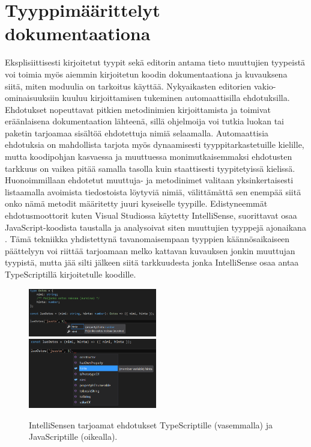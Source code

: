 \section{Tyyppimäärittelyt dokumentaationa}
Eksplisiittisesti kirjoitetut tyypit sekä editorin antama tieto muuttujien
tyypeistä voi toimia myös aiemmin kirjoitetun koodin dokumentaationa ja
kuvauksena siitä, miten moduulia on tarkoitus käyttää. Nykyaikasten editorien
vakio-ominaisuuksiin kuuluu kirjoittamisen tukeminen automaattisilla ehdotuksilla.
Ehdotukset nopeuttavat pitkien metodinimien kirjoittamista ja toimivat
eräänlaisena dokumentaation lähteenä, sillä ohjelmoija voi tutkia luokan tai
paketin tarjoamaa sisältöä ehdotettuja nimiä selaamalla. Automaattisia ehdotuksia
on mahdollista tarjota myös dynaamisesti tyyppitarkastetuille kielille, mutta
koodipohjan kasvaessa ja muuttuessa monimutkaisemmaksi ehdotusten tarkkuus
on vaikea pitää samalla tasolla kuin staattisesti tyypitetyissä kielissä.
Huonoimmillaan ehdotetut muuttuja- ja metodinimet valitaan yksinkertaisesti
listaamalla avoimista tiedostoista löytyviä nimiä, välittämättä sen
enempää siitä onko nämä metodit määritetty juuri kyseiselle tyypille.
Edistyneemmät ehdotusmoottorit kuten Visual Studiossa käytetty IntelliSense,
suorittavat osaa JavaScript-koodista taustalla ja analysoivat siten muuttujien
tyyppejä ajonaikana \cite{PreviewingSalsa, JavaScriptIntellisense}.
Tämä tekniikka yhdistettynä tavanomaisempaan tyyppien
käännösaikaiseen päättelyyn voi riittää tarjoamaan melko kattavan kuvauksen
jonkin muuttujan tyypistä, mutta jää silti jälkeen siitä tarkkuudesta jonka
IntelliSense osaa antaa TypeScriptillä kirjoitetulle koodille.
\begin{figure}
\includegraphics[width=0.5\textwidth]{images/intellisense_typescript}
\includegraphics[width=0.5\textwidth]{images/intellisense_javascript}
\noindent
\caption{IntelliSensen tarjoamat ehdotukset TypeScriptille (vasemmalla) ja JavaScriptille (oikealla).}
\end{figure}

